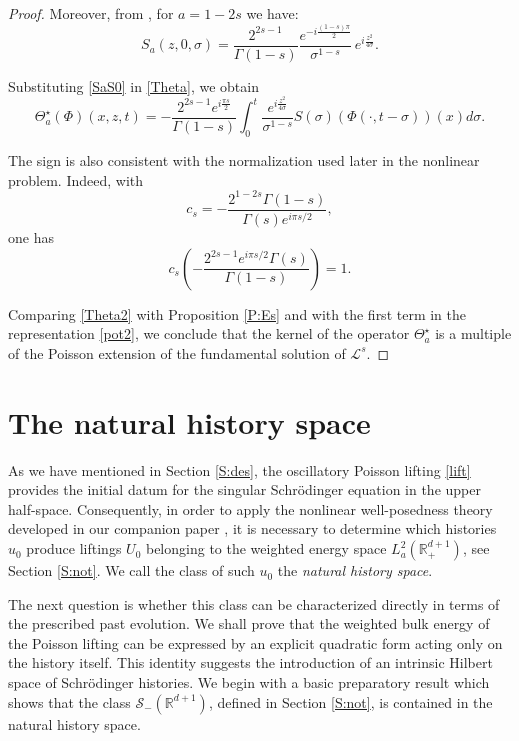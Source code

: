 \documentclass[11pt,letter]{amsart}
\def \RNu {\mathbb{R}^{d+1}}
\def \RN {\mathbb{R}_+^{d+1}}
\def \G{\Gamma}
\numberwithin{equation}{section}
\newcommand{\Le}{\mathcal L}
\newcommand{\Sm}{\mathscr S_-(\RNu)}
\numberwithin{equation}{section}
\begin{document}
\begin{proof}

Moreover, from \cite[(3.9)]{GS2}, for $a=1-2s$ we have:
\begin{equation}\label{SaS0}
S_a(z,0,\sigma)
= \frac{2^{2s-1}}{\G(1-s)}
\frac{e^{-i \frac{(1-s)\pi}{2}}}{\sigma^{1-s}}
\,e^{i \frac{z^2}{4\sigma}}.
\end{equation}


Substituting \eqref{SaS0} in \eqref{Theta}, we obtain
\begin{equation}\label{Theta2}
\Theta_a^\star(\Phi)(x,z,t) = -\frac{2^{2s-1}e^{i\frac{\pi s}2}}{\G(1-s)} \int_0^{t} \frac{e^{i\frac{z^2}{4\sigma}}}{\sigma^{1-s}} S(\sigma)(\Phi(\cdot,t-\sigma))(x)  d\sigma.
\end{equation}

The sign is also consistent with the normalization used later in the nonlinear problem. Indeed, with
\[
c_s=-\frac{2^{1-2s}\G(1-s)}{\G(s)e^{i\pi s/2}},
\]
one has
\[
c_s\left(-\frac{2^{2s-1}e^{i\pi s/2}\G(s)}{\G(1-s)}\right)=1.
\]

Comparing \eqref{Theta2} with Proposition \ref{P:Es} and with the first term in the representation  \eqref{pot2}, we conclude that the kernel of the operator $\Theta_a^\star$ is a multiple of the Poisson extension of the fundamental solution of $\Le^s$. 

\end{proof}



\section{The natural history space}\label{S:history}

As we have mentioned in Section \ref{S:des}, the oscillatory Poisson lifting \eqref{lift} provides the initial datum for the singular Schr\"odinger equation in the upper half-space. Consequently, in order to apply the nonlinear well-posedness theory developed in our companion paper \cite{GS2}, it is necessary to determine which histories $u_0$ produce liftings $U_0$ belonging to the weighted energy space $L^2_a(\RN)$, see Section \ref{S:not}. We call the class of such $u_0$ the \emph{natural history space}.

The next question is whether this class can be characterized directly in terms of the prescribed past evolution.
We shall prove that the weighted
bulk energy of the Poisson lifting can be expressed by an explicit quadratic
form acting only on the history itself. This identity suggests the
introduction of an intrinsic Hilbert space of Schr\"odinger histories.
We begin with a basic preparatory result which shows that the class $\Sm$, defined in Section \ref{S:not}, is contained in the natural history space.
\end{document}
